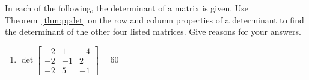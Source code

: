 \begin{exercise} \label{ex:} 
In each of the following, the determinant of a matrix is given. 
Use Theorem~\ref{thm:ppdet} on the row and column properties of a determinant to find the determinant of the other four listed matrices.
Give reasons for your answers.
\begin{enumerate}
\item \(\det\begin{bmatrix} -2 & 1 & -4
\\-2 & -1 & 2
\\-2 & 5 & -1 \end{bmatrix}=60\)



\end{enumerate}
\end{exercise}
